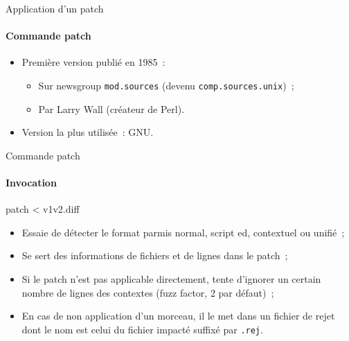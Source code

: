 \begin{frame}[fragile]{Application d'un patch}
\framesubtitle{Commande patch}
\begin{itemize}[<+->]
 \item Première version publié en 1985~:
 \begin{itemize}[<+->]
 \item Sur newsgroup \verb/mod.sources/ (devenu \verb/comp.sources.unix/)~;
 \item Par Larry Wall (créateur de Perl).
 \end{itemize}
 \item Version la plus utilisée~: GNU.
\end{itemize}
\end{frame}

\begin{frame}[fragile]{Commande patch}
\framesubtitle{Invocation}
 \begin{shell}
patch < v1v2.diff
 \end{shell}

 \begin{itemize}[<+->]
 \item Essaie de détecter le format parmis normal, script ed, contextuel ou unifié~;
 \item Se sert des informations de fichiers et de lignes dans le patch~;
 \item Si le patch n'est pas applicable directement, tente d'ignorer un certain nombre de lignes des contextes (fuzz factor, 2 par défaut)~;
 \item En cas de non application d'un morceau, il le met dans un fichier de rejet dont le nom est celui du fichier impacté suffixé par \verb|.rej|.
 \end{itemize}
\end{frame}
 
